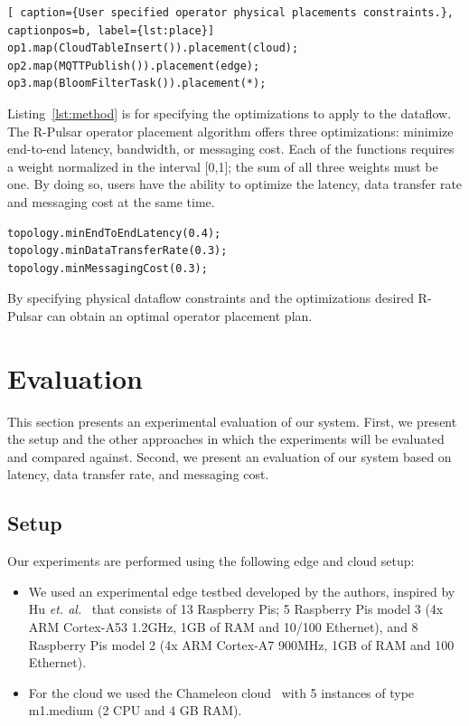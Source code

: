 \begin{lstlisting}[ caption={User specified operator physical placements constraints.}, captionpos=b, label={lst:place}]
op1.map(CloudTableInsert()).placement(cloud);
op2.map(MQTTPublish()).placement(edge);
op3.map(BloomFilterTask()).placement(*);
\end{lstlisting}

Listing~\ref{lst:method} is for specifying the optimizations to apply to the dataflow. The R-Pulsar operator placement algorithm offers three optimizations: minimize end-to-end latency, bandwidth, or messaging cost. Each of the functions requires a weight normalized in the interval [0,1]; the sum of all three weights must be one. By doing so, users have the ability to optimize the latency, data transfer rate and messaging cost at the same time.

\begin{lstlisting}[caption={User specified dataflow optimizations (latency, data transfer rate and cost).}, captionpos=b, label={lst:method}]
topology.minEndToEndLatency(0.4);
topology.minDataTransferRate(0.3);
topology.minMessagingCost(0.3);
\end{lstlisting}

By specifying physical dataflow constraints and the optimizations desired R-Pulsar can obtain an optimal operator placement plan.  

\section{Evaluation}\label{sec:evaluation}
This section presents an experimental evaluation of our system. First, we present the setup and the other approaches in which the experiments will be evaluated and compared against. Second, we present an evaluation of our system based on latency, data transfer rate, and messaging cost. 

\subsection{Setup}

Our experiments are performed using the following edge and cloud setup:

\begin{itemize}

\item We used an experimental edge testbed developed by the authors, inspired by Hu \textit{et. al.}~\cite{Hu2016QuantifyingTI} that consists of 13 Raspberry Pis; 5 Raspberry Pis model 3 (4x ARM Cortex-A53 1.2GHz, 1GB of RAM and 10/100 Ethernet), and 8 Raspberry Pis model 2 (4x ARM Cortex-A7 900MHz, 1GB of RAM and 100 Ethernet). 

\item For the cloud we used the Chameleon cloud~\cite{chameleon} with 5 instances of type m1.medium (2 CPU and 4 GB RAM).

\end{itemize}

